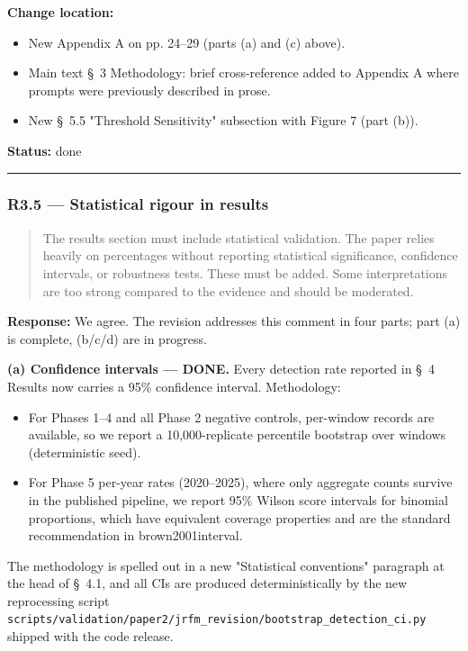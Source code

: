 \documentclass[11pt,a4paper]{article}
\begin{document}
\textbf{Change location:}

\begin{itemize}
\item New Appendix A on pp. 24--29 (parts (a) and (c) above).
\item Main text \S{}~3 Methodology: brief cross-reference added to Appendix A where prompts were previously described in prose.
\item New \S{}~5.5 "Threshold Sensitivity" subsection with Figure 7 (part (b)).
\end{itemize}

\textbf{Status:} done

\bigskip\hrule\bigskip

\subsubsection*{R3.5 --- Statistical rigour in results}

\begin{quote}
The results section must include statistical validation. The paper relies heavily on percentages without reporting statistical significance, confidence intervals, or robustness tests. These must be added. Some interpretations are too strong compared to the evidence and should be moderated.
\end{quote}

\textbf{Response:} We agree. The revision addresses this comment in four
parts; part (a) is complete, (b/c/d) are in progress.

\textbf{(a) Confidence intervals --- DONE.} Every detection rate reported in
\S{}~4 Results now carries a 95\% confidence interval. Methodology:

\begin{itemize}
\item For Phases 1--4 and all Phase 2 negative controls, per-window records are available, so we report a 10,000-replicate percentile bootstrap over windows (deterministic seed).
\item For Phase 5 per-year rates (2020--2025), where only aggregate counts survive in the published pipeline, we report 95\% Wilson score intervals for binomial proportions, which have equivalent coverage properties and are the standard recommendation in brown2001interval.
\end{itemize}

The methodology is spelled out in a new "Statistical conventions"
paragraph at the head of \S{}~4.1, and all CIs are produced deterministically
by the new reprocessing script
\texttt{scripts/validation/paper2/jrfm\_revision/bootstrap\_detection\_ci.py}
shipped with the code release.
\end{document}
